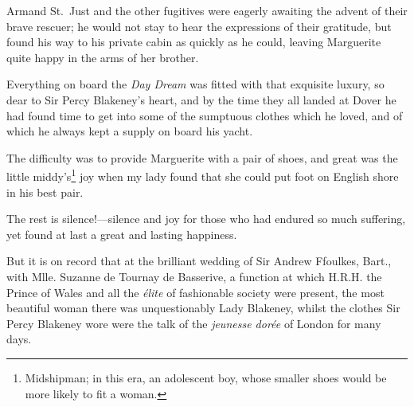 \documentclass[paper=a5,BCOR=7mm,twoside,DIV=calc,12pt,usegeometry,chapterprefix,endperiod,headings=big]{scrbook}
\begin{document}
Armand St.~Just and the other fugitives were eagerly awaiting the advent of their brave rescuer; he would not stay to hear the expressions of their gratitude, but found his way to his private cabin as quickly as he could, leaving Marguerite quite happy in the arms of her brother.

Everything on board the \textit{Day Dream} was fitted with that exquisite luxury, so dear to Sir Percy Blakeney's heart, and by the time they all landed at Dover he had found time to get into some of the sumptuous clothes which he loved, and of which he always kept a supply on board his yacht.

The difficulty was to provide Marguerite with a pair of shoes, and great was the little middy's\footnote{Midshipman; in this era, an adolescent boy, whose smaller shoes would be more likely to fit a woman.} joy when my lady found that she could put foot on English shore in his best pair.

The rest is silence!---silence and joy for those who had endured so much suffering, yet found at last a great and lasting happiness.

But it is on record that at the brilliant wedding of Sir Andrew Ffoulkes, Bart., with Mlle. Suzanne de Tournay de Basserive, a function at which H.R.H. the Prince of Wales and all the \textit{élite} of fashionable society were present, the most beautiful woman there was unquestionably Lady Blakeney, whilst the clothes Sir Percy Blakeney wore were the talk of the \textit{jeunesse dorée} of London for many days.
\end{document}
